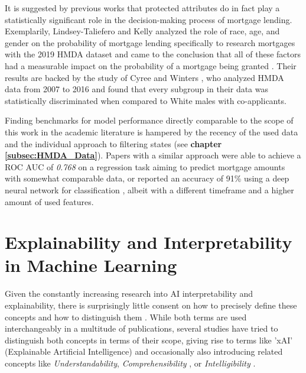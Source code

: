 It is suggested by previous works that protected attributes do in fact play a statistically significant role in the decision-making process of mortgage lending.
Exemplarily, Lindsey-Taliefero and Kelly analyzed the role of race, age, and gender on the probability of mortgage lending specifically to research mortgages with the 2019 HMDA dataset and came to the conclusion that all of these factors had a measurable impact on the probability of a mortgage being granted \parencite{LT2021}.
Their results are backed by the study of Cyree and Winters \cite{Cyree2023}, who analyzed HMDA data from 2007 to 2016 and found that every subgroup in their data was statistically discriminated when compared to White males with co-applicants.

Finding benchmarks for model performance directly comparable to the scope of this work in the academic literature is hampered by the recency of the used data and the individual approach to filtering states (see \textbf{chapter \ref{subsec:HMDA_Data}}).
Papers with a similar approach were able to achieve a ROC AUC of \textit{0.768} on a regression task aiming to predict mortgage amounts \parencite{Ghoba} with somewhat comparable data, 
or reported an accuracy of 91\% using a deep neural network for classification \parencite{Hodges2024}, albeit with a different timeframe and a higher amount of used features. 

\section{Explainability and Interpretability in Machine Learning}\label{sec:Explainability}

Given the constantly increasing research into AI interpretability and explainability, there is surprisingly little consent on how to precisely define these concepts and how to distinguish them \parencite{Linardatos2021}. 
While both terms are used interchangeably in a multitude of publications, several studies have tried to distinguish both concepts in terms of their scope, giving rise to terms like 'xAI' (Explainable Artificial Intelligence) \parencite{Gunning2019} and occasionally also introducing related concepts like \textit{Understandability}, \textit{Comprehensibility} \parencite{Guidotti2018}, or \textit{Intelligibility} \parencite{Caruana2015}.

